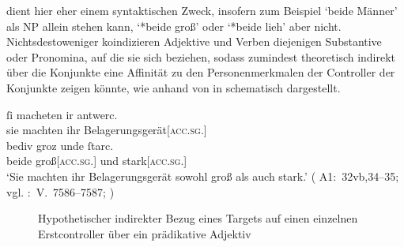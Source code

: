  dient hier eher einem syntaktischen Zweck, insofern zum
Beispiel  `beide Männer' als NP allein stehen
kann,  `*beide groß' oder  `*beide lieh'
aber nicht. Nichtsdestoweniger koindizieren
Adjektive und Verben diejenigen
Substantive oder Pronomina, auf die sie sich beziehen, sodass
 zumindest theoretisch indirekt über die Konjunkte eine Affinität
zu den Personenmerkmalen der Controller der Konjunkte
zeigen könnte, wie anhand von  in
 schematisch dargestellt.

\begin{exe}
\ex\label{ex:recquery}
	\gll ſi macheten ir antwerc. \\
		sie machten ihr Belagerungsgerät[\textsc{acc.sg.\NeutI}] \\
\sn \gll bediv groz unde ſtarc. \\
		beide groß[\textsc{acc.sg.\NeutI}] und stark[\textsc{acc.sg.\NeutI}] \\
	\trans `Sie machten ihr Belagerungsgerät sowohl groß als auch stark.'
			(%
				A1:~32vb,34--35; vgl.
				\KC:~V.~7586--7587;
				\cite[220]{schroeder1895}%
			)
\end{exe}

\begin{figure}
\caption{Hypothetischer indirekter Bezug eines Targets auf einen einzelnen
	Erstcontroller über ein prädikative Adjektiv}
\label{fig:recquery}
\end{figure}

